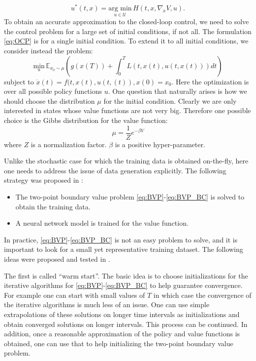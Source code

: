 \documentclass[12pt,AutoFakeBold,AutoFakeSlant]{article}
\newcommand{\bi}{\begin{itemize}}
\newcommand{\ei}{\end{itemize}}
\theoremstyle{definition}
\newcommand{\E}{\mathbb{E}}
\newcommand{\bx}{{x}}
\newcommand{\be}{\begin{equation}}
\newcommand{\ee}{\end{equation}}
\begin{document}
	\begin{equation}
	\label{eq: optimal feedback control using dVdx}
	u^* (t, x) = \underset{u \in \mathcal U}{\text{arg min}} \, H \left( t, x, \nabla_{\bx} V, u \right) .
	\end{equation}
	To obtain an accurate approximation to the closed-loop control, we need to solve the control problem
	for a large set of initial conditions, if not all.
	The formulation \eqref{eq:OCP} is for a single initial condition.  To extend it to all initial conditions,
	we consider instead the problem:
	\begin{equation}
	\label{eq: OCP1}
	\underset{u}{\text{min}} \,  \E_{\bx_0 \sim \mu} \left( g (x (T)) + \displaystyle \int_0^{T} L (t, x(t), u(t, \bx(t))) dt \right)
	\end{equation}
	subject to $\dot {x} (t) = f (t, x(t), u(t, (t)), x (0) = x_0 $.
	Here the optimization is over all possible policy functions $u$.
	One question that naturally arises is how we should choose the distribution $\mu$ for the initial condition.
	Clearly we are only interested in states whose value functions are not very big. Therefore one possible choice is
	the Gibbs distribution for the value function:
	\be
	\mu = \frac 1Z e^{-\beta V}
	\ee
	where $Z$ is a normalization factor. $\beta$ is a positive hyper-parameter. 

	Unlike the stochastic case for which the training data is obtained on-the-fly, here one needs to address the issue of 
	data generation explicitly. 
	The following strategy was proposed in \cite{nakamura2019adaptive, kang2019algorithms}:
	\bi
	\item The two-point boundary value problem \eqref{eq:BVP}-\eqref{eq:BVP_BC} is solved to obtain the training data.
	\item A neural network model is trained for the value function.
	\ei
	In practice, \eqref{eq:BVP}-\eqref{eq:BVP_BC} is not an easy problem to solve, and
	it is important to  look for a small yet representative training dataset.
	The following ideas were proposed and tested in \cite{nakamura2019adaptive, kang2019algorithms}.
	
	The first is called ``warm start''.   The basic idea is to choose initializations for the iterative algorithms for \eqref{eq:BVP}-\eqref{eq:BVP_BC} to help guarantee convergence.  For example one can start with small values of $T$ in which case the convergence
	of the iterative algorithms is much less of an issue. One can use simple extrapolations of  these solutions on longer time intervals
	as initializations and obtain converged solutions on longer intervals.  This process can be continued.
	In addition,  once a reasonable approximation of the policy and value functions is obtained, one can use that to help initializing the
	two-point boundary value problem.
	
\end{document}
